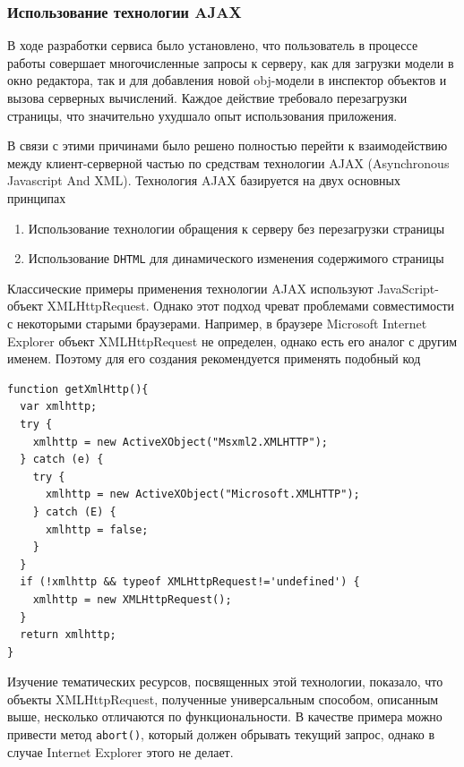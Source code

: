 \documentclass[12pt, a4paper]{article}
\begin{document}
\subsubsection{Использование технологии AJAX}

В ходе разработки сервиса было установлено, что пользователь в процессе работы
совершает многочисленные запросы к серверу, как для загрузки модели в окно
редактора, так и для добавления новой obj-модели в инспектор объектов и вызова
серверных вычислений. Каждое действие требовало перезагрузки страницы, что
значительно ухудшало опыт использования приложения.

В связи с этими причинами было решено полностью перейти к взаимодействию между
клиент-серверной частью по средствам технологии AJAX (Asynchronous Javascript
And XML). Технология AJAX базируется на двух основных принципах

\begin{enumerate}
    \item Использование технологии обращения к серверу без перезагрузки страницы
    \item Использование \texttt{DHTML} для динамического изменения содержимого
    страницы
\end{enumerate}

Классические примеры применения технологии AJAX используют JavaScript-объект
XMLHttpRequest. Однако этот подход чреват проблемами совместимости с некоторыми
старыми браузерами. Например, в браузере Microsoft Internet Explorer объект
XMLHttpRequest не определен, однако есть его аналог с другим именем. Поэтому для
его создания рекомендуется применять подобный код

\begin{lstlisting}
function getXmlHttp(){
  var xmlhttp;
  try {
    xmlhttp = new ActiveXObject("Msxml2.XMLHTTP");
  } catch (e) {
    try {
      xmlhttp = new ActiveXObject("Microsoft.XMLHTTP");
    } catch (E) {
      xmlhttp = false;
    }
  }
  if (!xmlhttp && typeof XMLHttpRequest!='undefined') {
    xmlhttp = new XMLHttpRequest();
  }
  return xmlhttp;
}
\end{lstlisting}

Изучение тематических ресурсов, посвященных этой технологии, показало, что
объекты XMLHttpRequest, полученные универсальным способом, описанным выше,
несколько отличаются по функциональности. В качестве примера можно привести
метод \texttt{abort()}, который должен обрывать текущий запрос, однако в случае
Internet Explorer этого не делает.
\end{document}
